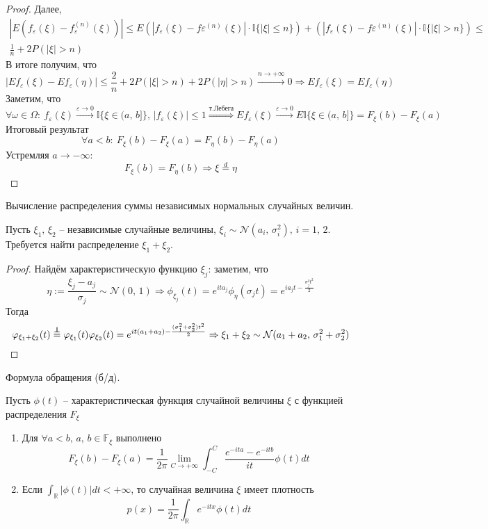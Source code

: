 \begin{proof}
	Далее,
	\begin{align*}
		|E(f_\varepsilon(\xi) - f_\varepsilon^{(n)}(\xi))| \leq E\left(|f_\varepsilon(\xi) - f\varepsilon^{(n)}(\xi)|\cdot\mathbb{I}\{|\xi| \leq n\}\right) + \left(|f_\varepsilon(\xi) - f\varepsilon^{(n)}(\xi)|
		\cdot\mathbb{I}\{|\xi| > n\}\right) \leq \\
		\frac{1}{n} + 2P(|\xi| > n)
	\end{align*}
	В итоге получим, что
	\[|Ef_\varepsilon(\xi) - Ef_\varepsilon(\eta)| \leq \frac{2}{n} + 2P(|\xi| > n) + 2P(|\eta| > n) \stackrel{n \to +\infty}{\to} 0 \Rightarrow Ef_\varepsilon(\xi) = Ef_\varepsilon(\eta)\]
	Заметим, что
	\[\forall \omega \in \Omega:\: f_\varepsilon(\xi) \stackrel{\varepsilon \to 0}{\to} \mathbb{I}\{\xi \in (a,\,b]\},\, |f_\varepsilon(\xi)| \leq 1 \stackrel{\text{т.Лебега}}{\Rightarrow} Ef_\varepsilon(\xi) \stackrel{\varepsilon \to 0}{\to} E\mathbb{I}\{\xi \in (a,\,b]\} = F_\xi(b) - F_\xi(a)\]
	Итоговый результат
	\[\forall a < b:\: F_\xi(b) - F_\xi(a) = F_\eta(b) - F_\eta(a)\]
	Устремляя $a \to -\infty$:
	\[F_\xi(b) = F_\eta(b) \Rightarrow \xi \stackrel{d}{=} \eta\]
\end{proof}

\begin{example}
	Вычисление распределения суммы независимых нормальных случайных величин.

	Пусть $\xi_1,\, \xi_2$ -- независимые случайные величины, $\xi_i \sim \mathcal{N}(a_i,\, \sigma_i^2),\, i = 1,\, 2$. Требуется найти распределение $\xi_1 + \xi_2$.
\end{example}

\begin{proof}
	Найдём характеристическую функцию $\xi_j$: заметим, что
	\[\eta := \frac{\xi_j - a_j}{\sigma_j} \sim \mathcal{N}(0,\,1) \Rightarrow \phi_{\xi_j}(t) = e^{ita_j}\phi_\eta(\sigma_j t) = e^{ia_jt - \frac{\sigma_j^2t^2}{2}}\]
	Тогда
	\[\phi_{\xi_1 + \xi_2}(t) \stackrel{\independent}{=} \phi_{\xi_1}(t)\phi_{\xi_2}(t) = e^{it(a_1 + a_2) - \frac{(\sigma_1^2 + \sigma_2^2)t^2}{2}} \Rightarrow \xi_1 + \xi_2 \sim \mathcal{N}(a_1 + a_2,\, \sigma_1^2 + \sigma_2^2)\]
\end{proof}

\begin{theorem}
	Формула обращения (б/д).

	Пусть $\phi(t)$ -- характеристическая функция случайной величины $\xi$ с функцией распределения $F_\xi$
	\begin{enumerate}
		\item Для $\forall a < b,\, a,\, b \in \mathbb{F_\xi}$ выполнено
		      \[F_\xi(b) - F_\xi(a) = \frac{1}{2\pi}\lim_{C \to +\infty}\int_{-C}^C \frac{e^{-ita} - e^{-itb}}{it}\phi(t)dt\]
		\item Если $\int_\mathbb{R}|\phi(t)|dt < +\infty$, то случайная величина $\xi$ имеет плотность
		      \[p(x) = \frac{1}{2\pi}\int_\mathbb{R}e^{-itx}\phi(t)dt\]
	\end{enumerate}
\end{theorem}
